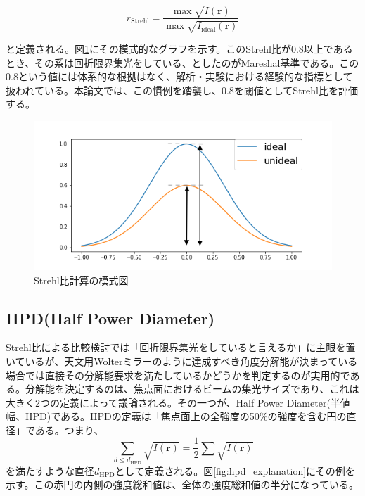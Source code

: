 \documentclass[dvipdfmx,autodetect-engine]{jreport}
\begin{document}
\[
r_{\mathrm{Strehl}} = \frac{ \max{\sqrt{I(\mathbf{r})} } }{ \max{ \sqrt{I_{\mathrm{ideal}}( \mathbf{r} )} } }
\]

と定義される。図\ref{fig:strehl_explanation}にその模式的なグラフを示す。このStrehl比が0.8以上であるとき、その系は回折限界集光をしている、としたのがMareshal基準である\citep{BornWolf:1999:Book}。この0.8という値には体系的な根拠はなく、解析・実験における経験的な指標として扱われている。本論文では、この慣例を踏襲し、0.8を閾値としてStrehl比を評価する。

\begin{figure}[h!]
\centering
\includegraphics[scale=0.6]{images/error_simulation/explanation/strehl.png}
\caption{Strehl比計算の模式図}
\label{fig:strehl_explanation}
\end{figure}

\subsection{HPD(Half Power Diameter)}
Strehl比による比較検討では「回折限界集光をしていると言えるか」に主眼を置いているが、天文用Wolterミラーのように達成すべき角度分解能が決まっている場合では直接その分解能要求を満たしているかどうかを判定するのが実用的である。分解能を決定するのは、焦点面におけるビームの集光サイズであり、これは大きく2つの定義によって議論される。その一つが、Half Power Diameter(半値幅、HPD)である。HPDの定義は「焦点面上の全強度の50\%の強度を含む円の直径」である。つまり、
\[
    \sum_{d\leq d_{\mathrm{HPD}}} \sqrt{ I(\mathbf{r}) } = \frac{1}{2} \sum \sqrt{ I(\mathbf{r}) }
\]
を満たすような直径$d_{\mathrm{HPD}}$として定義される。図\ref{fig:hpd_explanation}にその例を示す。この赤円の内側の強度総和値は、全体の強度総和値の半分になっている。
\end{document}

